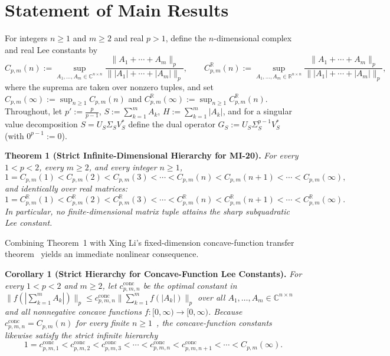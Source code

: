 \documentclass[10pt,letterpaper]{article}
\newcommand{\C}{\mathbb{C}}
\newcommand{\R}{\mathbb{R}}
\newcommand{\conc}{\mathrm{conc}}
\begin{document}
\section{Statement of Main Results}

For integers $n \ge 1$ and $m \ge 2$ and real $p > 1$, define the $n$-dimensional complex and real Lee constants by
\begin{equation}\label{eq:defC}
  C_{p,m}(n) := \sup_{A_1,\dots,A_m \in \C^{n\times n}} \frac{\|A_1 + \cdots + A_m\|_p}{\||A_1| + \cdots + |A_m|\|_p},
  \qquad
  C_{p,m}^{\R}(n) := \sup_{A_1,\dots,A_m \in \R^{n\times n}} \frac{\|A_1 + \cdots + A_m\|_p}{\||A_1| + \cdots + |A_m|\|_p},
\end{equation}
where the suprema are taken over nonzero tuples, and set $C_{p,m}(\infty) := \sup_{n \ge 1} C_{p,m}(n)$ and $C_{p,m}^{\R}(\infty) := \sup_{n \ge 1} C_{p,m}^{\R}(n)$. Throughout, let $p' := \frac{p}{p-1}$, $S := \sum_{k=1}^m A_k$, $H := \sum_{k=1}^m |A_k|$, and for a singular value decomposition $S = U_S \Sigma_S V_S^*$ define the dual operator $G_S := U_S \Sigma_S^{p-1} V_S^*$ (with $0^{p-1} := 0$).

\begin{tcolorbox}[mathbox]
\textbf{Theorem 1 (Strict Infinite-Dimensional Hierarchy for MI-20).}
\emph{For every $1 < p < 2$, every $m \ge 2$, and every integer $n \ge 1$,}
\[
  1 = C_{p,m}(1) < C_{p,m}(2) < C_{p,m}(3) < \cdots < C_{p,m}(n) < C_{p,m}(n+1) < \cdots < C_{p,m}(\infty),
\]
\emph{and identically over real matrices:}
\[
  1 = C_{p,m}^{\R}(1) < C_{p,m}^{\R}(2) < C_{p,m}^{\R}(3) < \cdots < C_{p,m}^{\R}(n) < C_{p,m}^{\R}(n+1) < \cdots < C_{p,m}^{\R}(\infty).
\]
\emph{In particular, no finite-dimensional matrix tuple attains the sharp subquadratic Lee constant.}
\end{tcolorbox}

Combining Theorem~1 with Xing Li's fixed-dimension concave-function transfer theorem~\cite[Theorem~1.1]{Li2026} yields an immediate nonlinear consequence.

\begin{tcolorbox}[lemmabox]
\textbf{Corollary 1 (Strict Hierarchy for Concave-Function Lee Constants).}
\emph{For every $1 < p < 2$ and $m \ge 2$, let $c_{p,m,n}^{\conc}$ be the optimal constant in $\|f(|\sum_{k=1}^m A_k|)\|_p \le c_{p,m,n}^{\conc} \|\sum_{k=1}^m f(|A_k|)\|_p$ over all $A_1,\dots,A_m \in \C^{n\times n}$ and all nonnegative concave functions $f : [0,\infty) \to [0,\infty)$. Because $c_{p,m,n}^{\conc} = C_{p,m}(n)$ for every finite $n \ge 1$~\cite{Li2026}, the concave-function constants likewise satisfy the strict infinite hierarchy}
\[
  1 = c_{p,m,1}^{\conc} < c_{p,m,2}^{\conc} < c_{p,m,3}^{\conc} < \cdots < c_{p,m,n}^{\conc} < c_{p,m,n+1}^{\conc} < \cdots < C_{p,m}(\infty).
\]
\end{tcolorbox}
\end{document}
